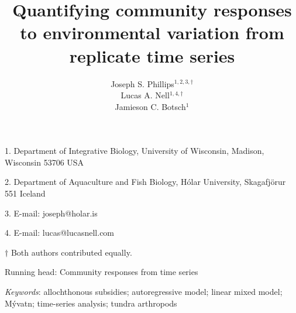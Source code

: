 \documentclass[12pt]{article}
\title{Quantifying community responses to environmental variation from replicate
time series}
\author{
Joseph S. Phillips$^{1,2,3,\dagger}$ \\
Lucas A. Nell$^{1,4,\dagger}$ \\
Jamieson C. Botsch$^{1}$}
\date{}
\begin{document}
\raggedright
\setlength\parindent{0.25in}

\maketitle


\noindent{} 1. Department of Integrative Biology, University of Wisconsin, Madison, Wisconsin 53706 USA

\noindent{} 2. Department of Aquaculture and Fish Biology, H\'{o}lar University, Skagafj\"{o}r{\dh}ur 551 Iceland

\noindent{} 3. E-mail: joseph@holar.is

\noindent{} 4. E-mail: lucas@lucasnell.com

\noindent{} $\dagger$ Both authors contributed equally.



\bigskip

Running head: {Community responses from time series}


\linenumbers{}

\clearpage




\bigskip

\textit{Keywords}: {allochthonous subsidies; autoregressive model; linear mixed model;
M\'{y}vatn; time-series analysis; tundra arthropods
}







\end{document}

